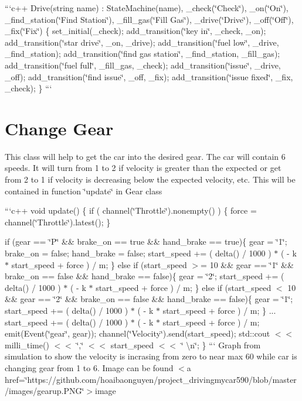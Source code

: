 ```c++ Drive(string name) \+: State\+Machine(name), \+\_\+check(\char`\"{}\+Check\char`\"{}), \+\_\+on(\char`\"{}\+On\char`\"{}), \+\_\+find\+\_\+station(\char`\"{}\+Find Station\char`\"{}), \+\_\+fill\+\_\+gas(\char`\"{}\+Fill Gas\char`\"{}), \+\_\+drive(\char`\"{}\+Drive\char`\"{}), \+\_\+off(\char`\"{}\+Off\char`\"{}), \+\_\+fix(\char`\"{}\+Fix\char`\"{}) \{ set\+\_\+initial(\+\_\+check); add\+\_\+transition(\char`\"{}key in\char`\"{}, \+\_\+check, \+\_\+on); add\+\_\+transition(\char`\"{}star drive\char`\"{}, \+\_\+on, \+\_\+drive); add\+\_\+transition(\char`\"{}fuel low\char`\"{}, \+\_\+drive, \+\_\+find\+\_\+station); add\+\_\+transition(\char`\"{}find gas station\char`\"{}, \+\_\+find\+\_\+station, \+\_\+fill\+\_\+gas); add\+\_\+transition(\char`\"{}fuel full\char`\"{}, \+\_\+fill\+\_\+gas, \+\_\+check); add\+\_\+transition(\char`\"{}issue\char`\"{}, \+\_\+drive, \+\_\+off); add\+\_\+transition(\char`\"{}find issue\char`\"{}, \+\_\+off, \+\_\+fix); add\+\_\+transition(\char`\"{}issue fixed\char`\"{}, \+\_\+fix, \+\_\+check); \} ```

\section*{Change Gear }

This class will help to get the car into the desired gear. The car will contain 6 speeds. It will turn from 1 to 2 if velocity is greater than the expected or get from 2 to 1 if velocity is decreasing below the expected velocity, etc. This will be contained in function \char`\"{}update\char`\"{} in Gear class

```c++ void update() \{ if ( channel(\char`\"{}\+Throttle\char`\"{}).nonempty() ) \{ force = channel(\char`\"{}\+Throttle\char`\"{}).latest(); \}

if (gear == \char`\"{}\+P\char`\"{} \&\& brake\+\_\+on == true \&\& hand\+\_\+brake == true)\{ gear = \char`\"{}1\char`\"{}; brake\+\_\+on = false; hand\+\_\+brake = false; start\+\_\+speed += ( delta() / 1000 ) $\ast$ ( -\/ k $\ast$ start\+\_\+speed + force ) / m; \} else if (start\+\_\+speed $>$= 10 \&\& gear == \char`\"{}1\char`\"{} \&\& brake\+\_\+on == false \&\& hand\+\_\+brake == false)\{ gear = \char`\"{}2\char`\"{}; start\+\_\+speed += ( delta() / 1000 ) $\ast$ ( -\/ k $\ast$ start\+\_\+speed + force ) / m; \} else if (start\+\_\+speed $<$ 10 \&\& gear == \char`\"{}2\char`\"{} \&\& brake\+\_\+on == false \&\& hand\+\_\+brake == false)\{ gear = \char`\"{}1\char`\"{}; start\+\_\+speed += ( delta() / 1000 ) $\ast$ ( -\/ k $\ast$ start\+\_\+speed + force ) / m; \} ... start\+\_\+speed += ( delta() / 1000 ) $\ast$ ( -\/ k $\ast$ start\+\_\+speed + force ) / m; emit(Event(\char`\"{}gear\char`\"{}, gear)); channel(\char`\"{}\+Velocity\char`\"{}).send(start\+\_\+speed); std\+::cout $<$$<$ milli\+\_\+time() $<$$<$ \char`\"{},\char`\"{} $<$$<$ start\+\_\+speed $<$$<$ \char`\"{} \textbackslash{}n\char`\"{}; \} ``` Graph from simulation to show the velocity is incrasing from zero to near max 60 while car is changing gear from 1 to 6. Image can be found $<$a href=\char`\"{}https\+://github.\+com/hoaibaonguyen/project\+\_\+drivingmycar590/blob/master/images/gearup.\+P\+N\+G\char`\"{}$>$image

